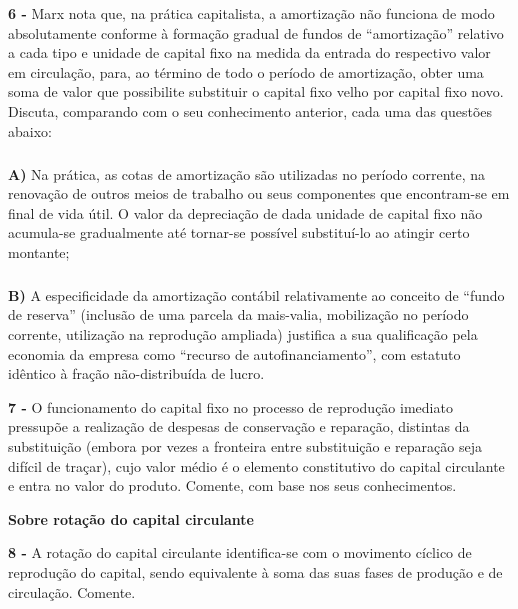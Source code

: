 \documentclass[a4paper, 12pt]{article} %
\begin{document}
\vspace{0.5cm}

\par \textbf{6 -} Marx nota que, na prática capitalista, a amortização não funciona de modo absolutamente conforme
à formação gradual de fundos de “amortização” relativo a cada tipo e unidade de capital fixo na medida
da entrada do respectivo valor em circulação, para, ao término de todo o período de amortização, obter
uma soma de valor que possibilite substituir o capital fixo velho por capital fixo novo. Discuta,
comparando com o seu conhecimento anterior, cada uma das questões abaixo:

\subparagraph{} \textbf{A)} Na prática, as cotas de amortização são utilizadas no período corrente, na renovação de outros
meios de trabalho ou seus componentes que encontram-se em final de vida útil. O valor da
depreciação de dada unidade de capital fixo não acumula-se gradualmente até tornar-se
possível substituí-lo ao atingir certo montante;

\subparagraph{} \textbf{B)} A especificidade da amortização contábil relativamente ao conceito de “fundo de reserva”
(inclusão de uma parcela da mais-valia, mobilização no período corrente, utilização na
reprodução ampliada) justifica a sua qualificação pela economia da empresa como “recurso de
autofinanciamento”, com estatuto idêntico à fração não-distribuída de lucro.

\vspace{0.5cm}

\par \textbf{7 -} O funcionamento do capital fixo no processo de reprodução imediato pressupõe a realização de
despesas de conservação e reparação, distintas da substituição (embora por vezes a fronteira entre
substituição e reparação seja difícil de traçar), cujo valor médio é o elemento constitutivo do capital
circulante e entra no valor do produto. Comente, com base nos seus conhecimentos.

\vspace{0.5cm}
\begin{center}
	\textbf{Sobre rotação do capital circulante}
\end{center}
\vspace{0.5cm}

\par \textbf{8 -} A rotação do capital circulante identifica-se com o movimento cíclico de reprodução do capital, sendo
equivalente à soma das suas fases de produção e de circulação. Comente.
\end{document}
